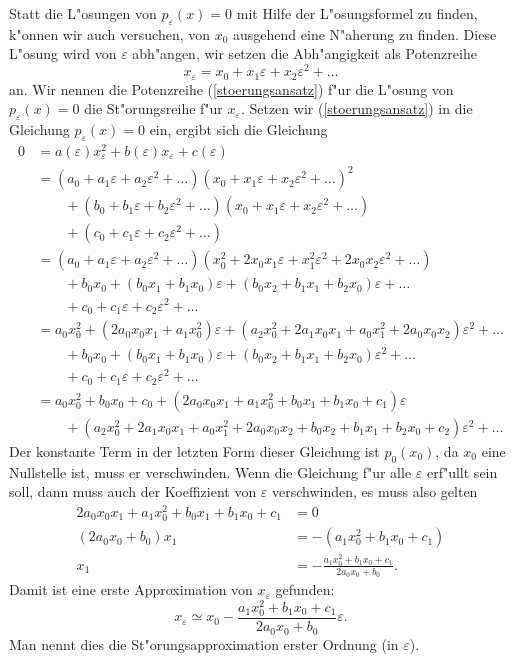 Statt die L"osungen von $p_{\varepsilon}(x)=0$ mit Hilfe der L"osungsformel
zu finden, k"onnen wir auch versuchen, von $x_0$ ausgehend eine N"aherung
zu finden. Diese L"osung wird von $\varepsilon$ abh"angen, wir setzen
die Abh"angigkeit als Potenzreihe
\begin{equation}
x_\varepsilon = x_0 + x_1\varepsilon +x_2 \varepsilon^2+\dots
\label{stoerungsansatz}
\end{equation}
an.
Wir nennen die Potenzreihe (\ref{stoerungsansatz}) f"ur die L"osung
von $p_\varepsilon(x)=0$ die St"orungsreihe f"ur $x_\varepsilon$.
Setzen wir (\ref{stoerungsansatz}) in die Gleichung $p_{\varepsilon}(x)=0$
ein, ergibt sich die Gleichung
\begin{align*}
0&=a(\varepsilon)x_\varepsilon^2+b(\varepsilon)x_\varepsilon+c(\varepsilon)
\\
&=
(a_0+a_1\varepsilon+a_2\varepsilon^2+\dots)
(x_0+x_1\varepsilon+x_2\varepsilon^2+\dots)^2\\
&\qquad
+
(b_0+b_1\varepsilon+b_2\varepsilon^2+\dots)
(x_0+x_1\varepsilon+x_2\varepsilon^2+\dots)\\
&\qquad
+
(c_0+c_1\varepsilon+c_2\varepsilon^2+\dots)
\\
&=
(a_0+a_1\varepsilon+a_2\varepsilon^2+\dots)
(x_0^2+2x_0x_1\varepsilon +x_1^2\varepsilon^2+2x_0x_2\varepsilon^2+\dots)
\\
&\qquad
+
b_0x_0 + (b_0x_1+b_1x_0)\varepsilon+(b_0x_2+b_1x_1+b_2x_0)\varepsilon+\dots\\
&\qquad
+
c_0+c_1\varepsilon+c_2\varepsilon^2+\dots
\\
&=
a_0x_0^2 + (2a_0x_0x_1 + a_1x_0^2)\varepsilon +
(a_2x_0^2 + 2a_1x_0x_1 + a_0x_1^2 +2a_0x_0x_2)\varepsilon^2+\dots
\\
&\qquad
+
b_0x_0 + (b_0x_1+b_1x_0)\varepsilon+(b_0x_2+b_1x_1+b_2x_0)\varepsilon^2+\dots\\
&\qquad
+
c_0+c_1\varepsilon+c_2\varepsilon^2+\dots
\\
&=
a_0x_0^2 + b_0x_0+c_0
+(2a_0x_0x_1+a_1x_0^2+b_0x_1+b_1x_0+c_1)\varepsilon
\\
&\qquad
+(
a_2x_0^2 + 2a_1x_0x_1 + a_0x_1^2 +2a_0x_0x_2
+b_0x_2+b_1x_1+b_2x_0
+c_2
)\varepsilon^2+\dots
\end{align*}
Der konstante Term in der letzten Form dieser Gleichung ist $p_0(x_0)$, 
da $x_0$ eine Nullstelle ist, muss er verschwinden. Wenn die Gleichung
f"ur alle $\varepsilon$ erf"ullt sein soll, dann muss auch der
Koeffizient von $\varepsilon$ verschwinden, es muss also gelten
\begin{align*}
2a_0x_0x_1+a_1x_0^2+b_0x_1+b_1x_0+c_1&= 0
\\
(2a_0x_0+b_0)x_1&=-(a_1x_0^2+b_1x_0+c_1)\\
x_1&=-
\frac{a_1x_0^2+b_1x_0+c_1}{2a_0x_0+b_0}.
\end{align*}
Damit ist eine erste Approximation von $x_\varepsilon$ gefunden:
\[
x_\varepsilon\simeq x_0 -
\frac{a_1x_0^2+b_1x_0+c_1}{2a_0x_0+b_0}\varepsilon.
\]
Man nennt dies die St"orungsapproximation erster Ordnung (in $\varepsilon$).

